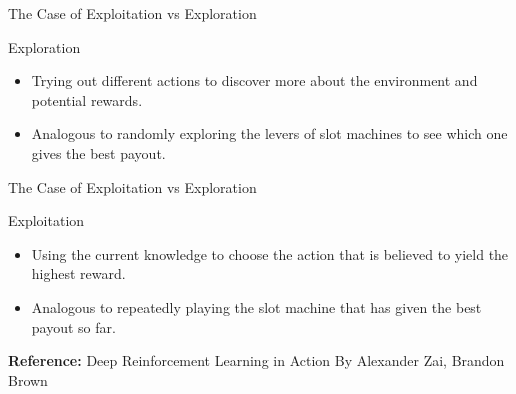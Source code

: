 \documentclass[aspectratio=169,xcolor=dvipsnames,svgnames,x11names,fleqn]{beamer}
\begin{document}
    \begin{frame}{The Case of Exploitation vs Exploration}
        \begin{tblock}{Exploration}
            \begin{itemize}
                \item Trying out different actions to discover more about the environment and potential rewards.
                \item Analogous to randomly exploring the levers of slot machines to see which one gives the best payout.
            \end{itemize}
        \end{tblock}
    \end{frame}

    \begin{frame}{The Case of Exploitation vs Exploration}

        \begin{tblock}{Exploitation}
            \begin{itemize}
                \item Using the current knowledge to choose the action that is believed to yield the highest reward.
                \item Analogous to repeatedly playing the slot machine that has given the best payout so far.
            \end{itemize}
        \end{tblock}
        \textbf{Reference:} Deep Reinforcement Learning in Action By Alexander Zai, Brandon Brown 

    \end{frame}
\end{document}
